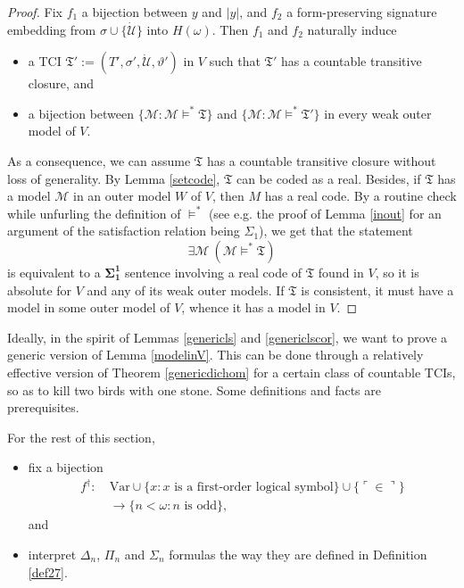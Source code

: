\documentclass[12pt, twoside]{memoir}
\numberwithin{equation}{section}
\theoremstyle{definition}
\theoremstyle{remark}
\theoremstyle{definition}
\theoremstyle{definition}
\theoremstyle{definition}
\theoremstyle{remark}
\begin{document}
\begin{proof}
Fix $f_1$ a bijection between $y$ and $|y|$, and $f_2$ a form-preserving signature embedding from $\sigma \cup \{\dot{\mathcal{U}}\}$ into $H(\omega)$. Then $f_1$ and $f_2$ naturally induce
\begin{itemize}
    \item a TCI $\mathfrak{T}' := (T', \sigma', \dot{\mathcal{U}}, \vartheta')$ in $V$ such that $\mathfrak{T}'$ has a countable transitive closure, and
    \item a bijection between $\{\mathcal{M} : \mathcal{M} \models^* \mathfrak{T}\}$ and $\{\mathcal{M} : \mathcal{M} \models^* \mathfrak{T}'\}$ in every weak outer model of $V$.
\end{itemize}
As a consequence, we can assume $\mathfrak{T}$ has a countable transitive closure without loss of generality. By Lemma \ref{setcode}, $\mathfrak{T}$ can be coded as a real. Besides, if $\mathfrak{T}$ has a model $\mathcal{M}$ in an outer model $W$ of $V$, then $M$ has a real code. By a routine check while unfurling the definition of $\models^*$ (see e.g. the proof of Lemma \ref{inout} for an argument of the satisfaction relation being $\Sigma_1$), we get that the statement $$\exists \mathcal{M} \ (\mathcal{M} \models^* \mathfrak{T})$$ is equivalent to a $\mathbf{\Sigma^1_1}$ sentence involving a real code of $\mathfrak{T}$ found in $V$, so it is absolute for $V$ and any of its weak outer models. If $\mathfrak{T}$ is consistent, it must have a model in some outer model of $V$, whence it has a model in $V$.
\end{proof}

Ideally, in the spirit of Lemmas \ref{genericls} and \ref{genericlscor}, we want to prove a generic version of Lemma \ref{modelinV}. This can be done through a relatively effective version of Theorem \ref{genericdichom} for a certain class of countable TCIs, so as to kill two birds with one stone. Some definitions and facts are prerequisites.

For the rest of this section,
\begin{itemize}
    \item fix a bijection 
    \begin{align*}
        f^{\dagger} : \ & \mathrm{Var} \cup \{x : x \text{ is a first-order logical symbol}\} \cup \{\ulcorner \in \urcorner\} \\
        & \longrightarrow \{n < \omega : n \text{ is odd}\} \text{,}
    \end{align*}
    and
    \item interpret $\Delta_n$, $\Pi_n$ and $\Sigma_n$ formulas the way they are defined in Definition \ref{def27}.
\end{itemize}
\end{document}

